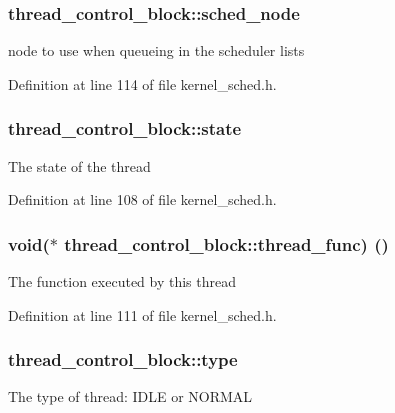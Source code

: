 \subsubsection[{\texorpdfstring{sched\+\_\+node}{sched_node}}]{ thread\+\_\+control\+\_\+block\+::sched\+\_\+node}\hypertarget{structthread__control__block_add433b079e04053fe70fdd2b92e1d6ad}{}\label{structthread__control__block_add433b079e04053fe70fdd2b92e1d6ad}
node to use when queueing in the scheduler lists 

Definition at line 114 of file kernel\+\_\+sched.\+h.

\subsubsection[{\texorpdfstring{state}{state}}]{ thread\+\_\+control\+\_\+block\+::state}\hypertarget{structthread__control__block_affd872365cf4768fa1c9bd1e196bb97c}{}\label{structthread__control__block_affd872365cf4768fa1c9bd1e196bb97c}
The state of the thread 

Definition at line 108 of file kernel\+\_\+sched.\+h.

\subsubsection[{\texorpdfstring{thread\+\_\+func}{thread_func}}]{\setlength{\rightskip}{0pt plus 5cm}void($\ast$ thread\+\_\+control\+\_\+block\+::thread\+\_\+func) ()}\hypertarget{structthread__control__block_a91a73f2ad3f727b7412b912b3d65109a}{}\label{structthread__control__block_a91a73f2ad3f727b7412b912b3d65109a}
The function executed by this thread 

Definition at line 111 of file kernel\+\_\+sched.\+h.

\subsubsection[{\texorpdfstring{type}{type}}]{ thread\+\_\+control\+\_\+block\+::type}\hypertarget{structthread__control__block_abd0f40bdcb22c701df03f560bbc42d5c}{}\label{structthread__control__block_abd0f40bdcb22c701df03f560bbc42d5c}
The type of thread\+: I\+D\+LE or N\+O\+R\+M\+AL 

